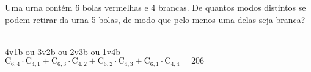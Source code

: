 \begin{ex}
Uma urna contém 6 bolas vermelhas e 4 brancas. De quantos modos distintos se podem retirar da urna 5 bolas, de modo que pelo menos  uma delas seja branca?
  \begin{sol}
   \phantom{A} \\
   4v1b ou 3v2b ou 2v3b ou 1v4b \\
   $\mathrm{C}_{6,4}\cdot\mathrm{C}_{4,1}+\mathrm{C}_{6,3}\cdot\mathrm{C}_{4,2}+\mathrm{C}_{6,2}\cdot\mathrm{C}_{4,3}+\mathrm{C}_{6,1}\cdot\mathrm{C}_{4,4}=206$
  \end{sol}
\end{ex}